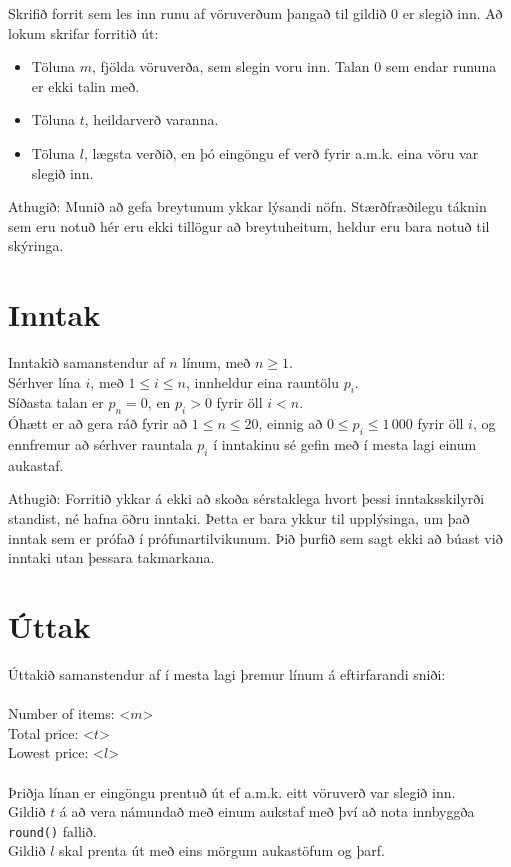 
\noindent
Skrifið forrit sem les inn runu af vöruverðum þangað til gildið $0$ er slegið inn.
Að lokum skrifar forritið út:
\begin{itemize} 
    \item Töluna $m$, fjölda vöruverða, sem slegin voru inn. Talan $0$ sem endar rununa er ekki talin með.
    \item Töluna $t$, heildarverð varanna.
    \item Töluna $l$, lægsta verðið, en þó eingöngu ef verð fyrir a.m.k. eina vöru var slegið inn.
\end{itemize}

Athugið: Munið að gefa breytunum ykkar lýsandi nöfn.
Stærðfræðilegu táknin sem eru notuð hér eru ekki tillögur að breytuheitum, heldur eru bara notuð til skýringa.

\section*{Inntak}
Inntakið samanstendur af $n$ línum, með $n \ge 1$. \\
Sérhver lína $i$, með $1 \le i \le n$, innheldur eina rauntölu $p_i$. \\
Síðasta talan er $p_n = 0$, en $p_i > 0$ fyrir öll $i < n$. \\
Óhætt er að gera ráð fyrir að $1 \le n \le 20$,
einnig að $0 \le p_i \le 1\,000$ fyrir öll $i$,
og ennfremur að sérhver rauntala $p_i$ í inntakinu sé gefin með í mesta lagi einum aukastaf.

Athugið: Forritið ykkar á ekki að skoða sérstaklega hvort þessi inntaksskilyrði standist, né hafna öðru inntaki.
Þetta er bara ykkur til upplýsinga, um það inntak sem er prófað í prófunartilvikunum.
Þið þurfið sem sagt ekki að búast við inntaki utan þessara takmarkana.

\section*{Úttak}
Úttakið samanstendur af í mesta lagi þremur línum á eftirfarandi sniði: \\ \\
\noindent
Number of items: <$m$> \\
\noindent
Total price: <$t$> \\
\noindent
Lowest price: <$l$> \\ \\
\noindent
Þriðja línan er eingöngu prentuð út ef a.m.k. eitt vöruverð var slegið inn. \\
\noindent
Gildið $t$ á að vera námundað með einum aukstaf með því að nota innbyggða \texttt{round()} fallið. \\
\noindent
Gildið $l$ skal prenta út með eins mörgum aukastöfum og þarf.
